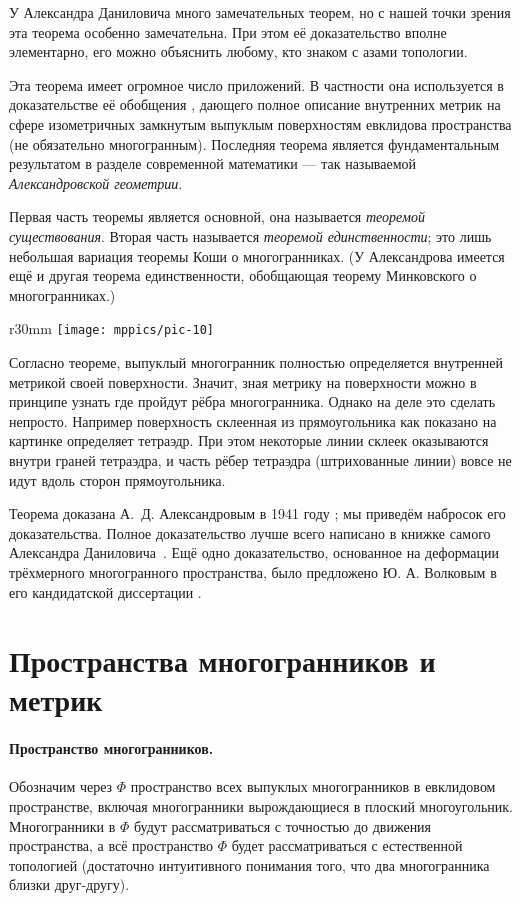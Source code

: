 \documentclass[oneside,a4paper]{article}
\begin{document}
У Александра Даниловича много замечательных теорем, но с нашей точки зрения эта теорема особенно замечательна.
При этом её доказательство вполне элементарно, его можно объяснить любому, кто знаком с азами топологии.

Эта теорема имеет огромное число приложений.
В частности она используется в доказательстве её обобщения \cite{alexandrov-1948},
дающего полное описание внутренних метрик на сфере изометричных замкнутым выпуклым поверхностям  евклидова пространства (не обязательно многогранным).
Последняя теорема является фундаментальным результатом в разделе современной математики --- так называемой \emph{Александровской геометрии}.

Первая часть теоремы является основной, она называется \emph{теоремой существования}.
Вторая часть называется \emph{теоремой единственности}; это лишь небольшая вариация теоремы Коши о многогранниках.
(У Александрова имеется ещё и другая теорема единственности, обобщающая теорему Минковского о многогранниках.)

\begin{wrapfigure}{r}{30mm}
\vskip-4mm
\centering
\texttt{[image: mppics/pic-10]}
\vskip-0mm
\end{wrapfigure}

Согласно теореме, выпуклый многогранник полностью определяется внутренней метрикой своей поверхности.
Значит, зная метрику на поверхности можно в принципе узнать где пройдут рёбра многогранника.
Однако на деле это сделать непросто.
Например поверхность склеенная из прямоугольника как показано на картинке определяет тетраэдр.
При этом некоторые линии склеек оказываются внутри граней тетраэдра, и часть рёбер тетраэдра (штрихованные линии) вовсе не идут вдоль сторон прямоугольника.

Теорема доказана А.~Д. Александровым в 1941 году \cite{alexandrov-1941};
мы приведём набросок его доказательства. 
Полное доказательство лучше всего написано в книжке самого Александра Даниловича~\cite{alexandrov}.
Ещё одно доказательство, основанное на деформации трёхмерного многогранного пространства, было предложено Ю. А. Волковым в его кандидатской диссертации \cite{volkov}.


\section{Пространства многогранников и метрик}

\paragraph{Пространство многогранников.}
Обозначим через $\Phi$ пространство всех выпуклых многогранников в евклидовом пространстве, включая многогранники вырождающиеся в плоский многоугольник.
Многогранники в $\Phi$ будут рассматриваться с точностью до движения пространства, а всё пространство $\Phi$ будет рассматриваться с естественной топологией (достаточно интуитивного понимания того, что два многогранника близки друг-другу).
\end{document}
